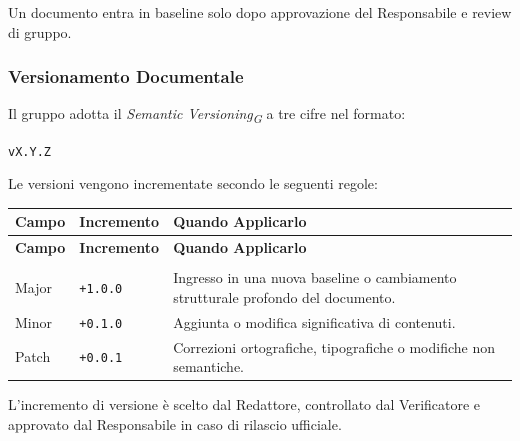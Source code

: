 Un documento entra in baseline solo dopo approvazione del Responsabile e review
di gruppo.


\subsubsection{Versionamento Documentale}

Il gruppo adotta il \textit{Semantic Versioning\textsubscript{G}} a tre cifre nel
formato:

\begin{center}
    \texttt{vX.Y.Z}
\end{center}

Le versioni vengono incrementate secondo le seguenti regole:

\begin{xltabular}{\textwidth}{
    >{\raggedright\arraybackslash}p{2.5cm}
    >{\raggedright\arraybackslash}p{3cm}
    >{\raggedright\arraybackslash}X
}
    \toprule
    \textbf{Campo} & \textbf{Incremento} & \textbf{Quando Applicarlo} \\
    \midrule
    \endfirsthead

    \toprule
    \textbf{Campo} & \textbf{Incremento} & \textbf{Quando Applicarlo} \\
    \midrule
    \endhead

    \midrule
     \\
    \endfoot

    \bottomrule
    \endlastfoot

    Major
    & \texttt{+1.0.0}
    & Ingresso in una nuova baseline o cambiamento strutturale profondo del documento. \\

    Minor
    & \texttt{+0.1.0}
    & Aggiunta o modifica significativa di contenuti. \\

    Patch
    & \texttt{+0.0.1}
    & Correzioni ortografiche, tipografiche o modifiche non semantiche. \\

\end{xltabular}

L'incremento di versione è scelto dal Redattore, controllato dal Verificatore e
approvato dal Responsabile in caso di rilascio ufficiale.


